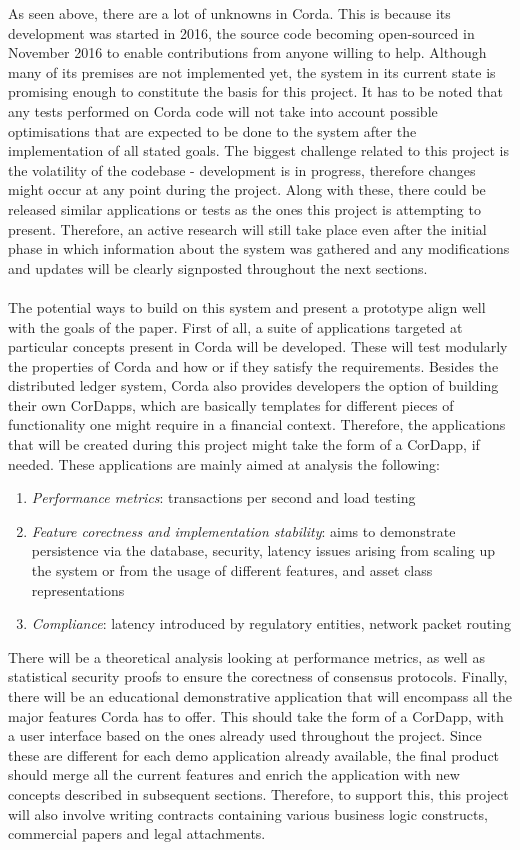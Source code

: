 \documentclass[12pt,twoside]{article}
\begin{document}
As seen above, there are a lot of unknowns in Corda. This is because its development was started in 2016, the source code becoming open-sourced in November 2016 to enable contributions from anyone willing to help. Although many of its premises are not implemented yet, the system in its current state is promising enough to constitute the basis for this project. It has to be noted that any tests performed on Corda code will not take into account possible optimisations that are expected to be done to the system after the implementation of all stated goals. The biggest challenge related to this project is the volatility of the codebase - development is in progress, therefore changes might occur at any point during the project. Along with these, there could be released similar applications or tests as the ones this project is attempting to present. Therefore, an active research will still take place even after the initial phase in which information about the system was gathered and any modifications and updates will be clearly signposted throughout the next sections. 
\\ \\
The potential ways to build on this system and present a prototype align well with the goals of the paper. First of all, a suite of applications targeted at particular concepts present in Corda will be developed. These will test modularly the properties of Corda and how or if they satisfy the requirements. Besides the distributed ledger system, Corda also provides developers the option of building their own CorDapps, which are basically templates for different pieces of functionality one might require in a financial context. Therefore, the applications that will be created during this project might take the form of a CorDapp, if needed. These applications are mainly aimed at analysis the following:
\begin{enumerate}
\item \textit{Performance metrics}: transactions per second and load testing
\item \textit{Feature corectness and implementation stability}: aims to demonstrate persistence via the database, security, latency issues arising from scaling up the system or from the usage of different features, and asset class representations
\item \textit{Compliance}: latency introduced by regulatory entities, network packet routing 
\end{enumerate}
There will be a theoretical analysis looking at performance metrics, as well as statistical security proofs to ensure the corectness of consensus protocols. Finally, there will be an educational demonstrative application that will encompass all the major features Corda has to offer. This should take the form of a CorDapp, with a user interface based on the ones already used throughout the project. Since these are different for each demo application already available, the final product should merge all the current features and enrich the application with new concepts described in subsequent sections. Therefore, to support this, this project will also involve writing contracts containing various business logic constructs, commercial papers and legal attachments.
\end{document}
